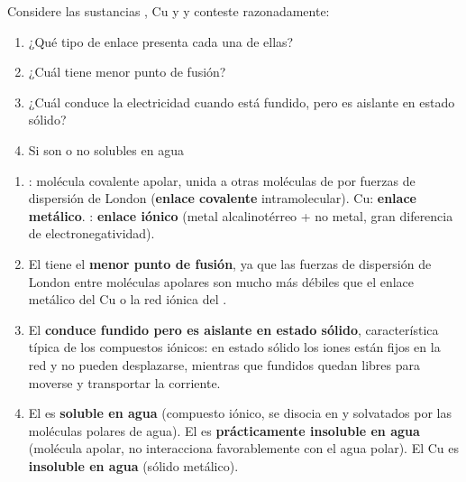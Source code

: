 \begin{exerciseEVAU}
    Considere las sustancias , Cu y  y conteste razonadamente:
    \begin{enumerate}[label=\letraminuscula]
    \item ¿Qué tipo de enlace presenta cada una de ellas?
    \item ¿Cuál tiene menor punto de fusión?
    \item ¿Cuál conduce la electricidad cuando está fundido, pero es aislante en estado sólido?
    \item Si son o no solubles en agua
    \end{enumerate}
    \begin{solu}
        \begin{enumerate}[label=\letraminuscula]
            \item {}: molécula covalente apolar, unida a otras moléculas de  por fuerzas de dispersión de London (\textbf{enlace covalente} intramolecular). Cu: \textbf{enlace metálico}. : \textbf{enlace iónico} (metal alcalinotérreo + no metal, gran diferencia de electronegatividad).

            \item El  tiene el \textbf{menor punto de fusión}, ya que las fuerzas de dispersión de London entre moléculas apolares son mucho más débiles que el enlace metálico del Cu o la red iónica del .

            \item El  \textbf{conduce fundido pero es aislante en estado sólido}, característica típica de los compuestos iónicos: en estado sólido los iones están fijos en la red y no pueden desplazarse, mientras que fundidos quedan libres para moverse y transportar la corriente.

            \item El  es \textbf{soluble en agua} (compuesto iónico, se disocia en  y  solvatados por las moléculas polares de agua). El  es \textbf{prácticamente insoluble en agua} (molécula apolar, no interacciona favorablemente con el agua polar). El Cu es \textbf{insoluble en agua} (sólido metálico).
        \end{enumerate}
    \end{solu}
\end{exerciseEVAU}

